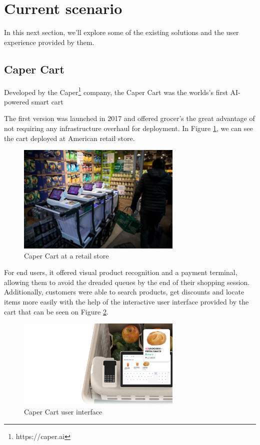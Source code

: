 \documentclass[openright]{normas-utf-tex} %
\begin{document}
\section{Current scenario}

In this next section, we'll explore some of the existing solutions and the user experience
provided by them.

\subsection{Caper Cart}

Developed by the Caper\footnote{https://caper.ai} company, the Caper Cart was the worlds's first AI-powered smart cart \cite{Caper2020}

The first version was launched in 2017 and offered grocer's the
great advantage of not requiring any infrastructure overhaul for deployment.
In Figure \ref{fig:caperatretail}, we can see the cart deployed at American
retail store.

\begin{figure}[H]
	\centering
	\includegraphics[width=0.7\textwidth]{./images/caper.png}
	\caption[Caper Cart at a retail store]{Caper Cart at a retail store}
	\label{fig:caperatretail}
\end{figure}

For end users, it offered visual product recognition and a payment terminal,
allowing them to avoid the dreaded queues by the end of their shopping session.
Additionally, customers were able to search products, get discounts and locate
items more easily with the help of the interactive user interface provided by the cart that 
can be seen on Figure \ref{fig:caperui}.

\begin{figure}[H]
	\centering
	\includegraphics[width=0.7\textwidth]{./images/capercartui.png}
	\caption[Caper Cart user interface]{Caper Cart user interface}
	\label{fig:caperui}
\end{figure}
\end{document}
